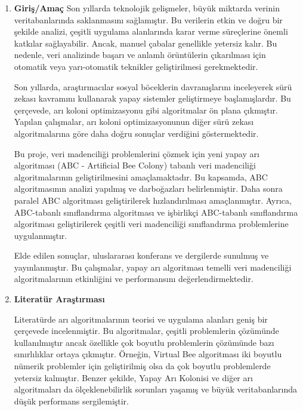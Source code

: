 \documentclass[12pt,a4paper]{article}
\begin{document}
	\begin{enumerate}
	\item{\bf\fontsize{12pt}{14pt}\selectfont
 Giriş/Amaç}\newline\newline
Son yıllarda teknolojik gelişmeler, büyük miktarda verinin veritabanlarında saklanmasını sağlamıştır. Bu verilerin etkin ve doğru bir şekilde analizi, çeşitli uygulama alanlarında karar verme süreçlerine önemli katkılar sağlayabilir. Ancak, manuel çabalar genellikle yetersiz kalır. Bu nedenle, veri analizinde başarı ve anlamlı örüntülerin çıkarılması için otomatik veya yarı-otomatik teknikler geliştirilmesi gerekmektedir.

Son yıllarda, araştırmacılar sosyal böceklerin davranışlarını inceleyerek sürü zekası kavramını kullanarak yapay sistemler geliştirmeye başlamışlardır. Bu çerçevede, arı koloni optimizasyonu gibi algoritmalar ön plana çıkmıştır. Yapılan çalışmalar, arı koloni optimizasyonunun diğer sürü zekası algoritmalarına göre daha doğru sonuçlar verdiğini göstermektedir.

Bu proje, veri madenciliği problemlerini çözmek için yeni yapay arı algoritması (ABC - Artificial Bee Colony) tabanlı veri madenciliği algoritmalarının geliştirilmesini amaçlamaktadır. Bu kapsamda, ABC algoritmasının analizi yapılmış ve darboğazları belirlenmiştir. Daha sonra paralel ABC algoritması geliştirilerek hızlandırılması amaçlanmıştır. Ayrıca, ABC-tabanlı sınıflandırma algoritması ve işbirlikçi ABC-tabanlı sınıflandırma algoritması geliştirilerek çeşitli veri madenciliği sınıflandırma problemlerine uygulanmıştır.

Elde edilen sonuçlar, uluslararası konferans ve dergilerde sunulmuş ve yayınlanmıştır. Bu çalışmalar, yapay arı algoritması temelli veri madenciliği algoritmalarının etkinliğini ve performansını değerlendirmektedir.
\newline\newline\newline
 \item{\bf\fontsize{12pt}{14pt}\selectfont Literatür Araştırması} \newline
	
Literatürde arı algoritmalarının teorisi ve uygulama alanları geniş bir çerçevede incelenmiştir. Bu algoritmalar, çeşitli problemlerin çözümünde kullanılmıştır ancak özellikle çok boyutlu problemlerin çözümünde bazı sınırlılıklar ortaya çıkmıştır. Örneğin, Virtual Bee algoritması iki boyutlu nümerik problemler için geliştirilmiş olsa da çok boyutlu problemlerde yetersiz kalmıştır. Benzer şekilde, Yapay Arı Kolonisi ve diğer arı algoritmaları da ölçeklenebilirlik sorunları yaşamış ve büyük veritabanlarında düşük performans sergilemiştir.


\end{enumerate}
\end{document}
